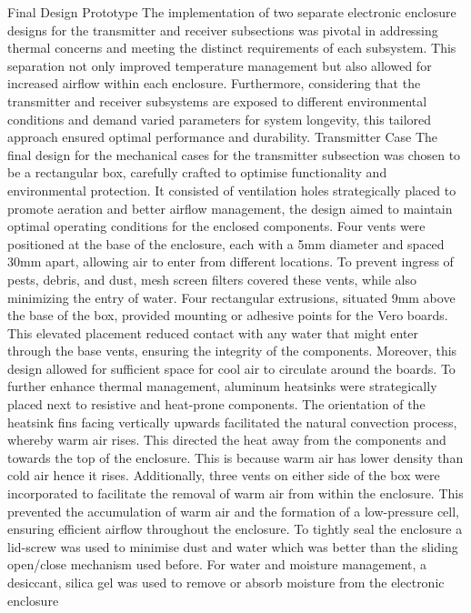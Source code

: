 \documentclass[class=report,11pt,crop=false]{standalone}
\begin{document}
Final Design Prototype
The implementation of two separate electronic enclosure designs for the transmitter and receiver subsections was pivotal in addressing thermal concerns and meeting the distinct requirements of each subsystem. This separation not only improved temperature management but also allowed for increased airflow within each enclosure. Furthermore, considering that the transmitter and receiver subsystems are exposed to different environmental conditions and demand varied parameters for system longevity, this tailored approach ensured optimal performance and durability.
Transmitter Case
The final design for the mechanical cases for the transmitter subsection was chosen to be a rectangular box, carefully crafted to optimise functionality and environmental protection. It consisted of ventilation holes strategically placed to promote aeration and better airflow management, the design aimed to maintain optimal operating conditions for the enclosed components. Four vents were positioned at the base of the enclosure, each with a 5mm diameter and spaced 30mm apart, allowing air to enter from different locations. To prevent ingress of pests, debris, and dust, mesh screen filters covered these vents, while also minimizing the entry of water.
Four rectangular extrusions, situated 9mm above the base of the box, provided mounting or adhesive points for the Vero boards. This elevated placement reduced contact with any water that might enter through the base vents, ensuring the integrity of the components. Moreover, this design allowed for sufficient space for cool air to circulate around the boards.
To further enhance thermal management, aluminum heatsinks were strategically placed next to resistive and heat-prone components. The orientation of the heatsink fins facing vertically upwards facilitated the natural convection process, whereby warm air rises. This directed the heat away from the components and towards the top of the enclosure. This is because warm air has lower density than cold air hence it rises. 
Additionally, three vents on either side of the box were incorporated to facilitate the removal of warm air from within the enclosure. This prevented the accumulation of warm air and the formation of a low-pressure cell, ensuring efficient airflow throughout the enclosure.
To tightly seal the enclosure a lid-screw was used to minimise dust and water which was better than the sliding open/close mechanism used before.
For water and moisture management, a desiccant, silica gel was used to remove or absorb moisture from the electronic enclosure
\end{document}
